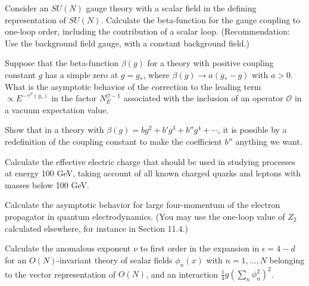 
\begin{enumerate}
   Consider an $SU(N)$ gauge theory with a scalar field in the defining representation of $SU(N)$. Calculate the beta-function for the gauge coupling to one-loop order, including the contribution of a scalar loop. (Recommendation: Use the background field gauge, with a constant background field.)

   Suppose that the beta-function $\beta(g)$ for a theory with positive coupling constant $g$ has a simple zero at $g=g_*$, where $\beta(g)\to a(g_*-g)$ with $a>0$. What is the asymptotic behavior of the correction to the leading term $\propto E^{-\gamma^{\mathcal O}(g_*)}$ in the factor $N_E^{\mathcal O-1}$ associated with the inclusion of an operator $\mathcal O$ in a vacuum expectation value.

   Show that in a theory with $\beta(g)=bg^2+b'g^3+b''g^4+\cdots$, it is possible by a redefinition of the coupling constant to make the coefficient $b''$ anything we want.

   Calculate the effective electric charge that should be used in studying processes at energy 100 GeV, taking account of all known charged quarks and leptons with masses below 100 GeV.

   Calculate the asymptotic behavior for large four-momentum of the electron propagator in quantum electrodynamics. (You may use the one-loop value of $Z_2$ calculated elsewhere, for instance in Section 11.4.)

   Calculate the anomalous exponent $\nu$ to first order in the expansion in $\epsilon=4-d$ for an $O(N)$-invariant theory of scalar fields $\phi_n(x)$ with $n=1,\ldots,N$ belonging to the vector representation of $O(N)$, and an interaction $\tfrac14 g(\sum_n\phi_n^2)^2$.
\end{enumerate}

